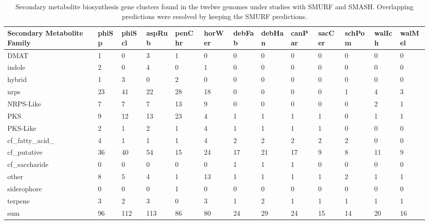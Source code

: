 \documentclass[fontsize=10pt, paper=a4,fleqn, ]{wlscirep}
\begin{document}
\begin{table}
  \small
  \begin{tabular}{|p{1.5cm}|l|l|l|l|l|l|l|l|l|l|l|l|}
    \hline
    Secondary Metabolite Family& phiSp& phiScl&	aspRub& penChr&horWer&	 debFab& debHan& canPar&  sacCer&schPom&walIch&walMel\\
    \hline                                     	               	      	                  
    \hline                                     	               	      	                  
    DMAT&	                 1&      0&	 3&	1&     	 0&   	  0&	0&      0&        0&	0&	0&	0\\
    indole&	                 2&      0&	 4&	0&     	 1&   	  0&	0&      0&        0&	0&	0&	0\\
    hybrid&	                 1&      3&	 0&	2&     	 0&   	  0&	0&      0&        0&	0&	0&	0\\
    nrps&	                 23&     41&	 22&	28&    	 18&  	  0&	0&      0&        0&	1&	4&	3\\
    NRPS-Like&	                 7&      7&	 7&	13&    	 9&   	  0&	0&      0&        0&	0&	2&	1\\
    PKS&	                 9&      12&	 13&	23&    	 4&   	  1&	1&      1&        1&	0&	1&	1\\
    PKS-Like&	                 2&      1&	 2&	1&     	 4&   	  1&	1&      1&        1&	0&	0&	0\\
    cf\_fatty\_acid\_&	         4&      1&	 1&	1&     	 4&   	  2&	2&      2&        2&	2&	0&	0\\
    cf\_putative&	         36&     40&	 54&	15&    	 24&  	  17&	21&     17&       9&	8&	11&	9\\
    cf\_saccharide&	         0&      0&	 0&	0&     	 0&   	  1&	1&      1&        0&	0&	0&	0\\
    other&	                 8&      5&	 4&	1&     	 13&  	  1&	1&      1&        1&	2&	1&	1\\
    siderophore&	         0&      0&	 0&	1&     	 0&   	  0&	0&      0&        0&	0&	0&	0\\
    terpene&	                 3&      2&	 3&	0&     	 3&   	  1&	2&      1&        1&	1&	1&	1\\
    \hline                                     	               	      	                  
    sum    &                     96& 	 112&  	113&     86&   	  80& 	  24&     29&    24&       15&     14&     20&     16\\
    \hline
  \end{tabular}
  \caption{\label{tab:cluster} Secondary metabolite biosynthesis gene
    clusters found in the twelwe genomes under studies with SMURF and SMASH. 
    Overlapping predictions were resolved by keeping the SMURF predictions.}
\end{table}
\end{document}

